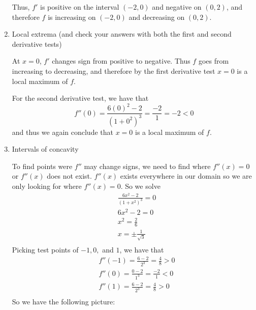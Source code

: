 \documentclass[nooutcomes]{ximera}
\begin{document}
\begin{problem}
\begin{enumerate}
\begin{freeResponse}
\begin{center}
\begin{image}
\end{image}
\end{center}


		Thus, $f'$ is positive on the interval $(-2,0)$ and negative on $(0,2)$, and therefore $f$ is increasing on $(-2,0)$ and decreasing on $(0,2)$.  
		\end{freeResponse}
		
	\item  Local extrema (and check your answers with both the first and second derivative tests)
	
		\begin{freeResponse}
		At $x=0$, $f'$ changes sign from positive to negative.  Thus $f$ goes from increasing to decreasing, and therefore by the first derivative test $x=0$ is a local maximum of $f$.  
		
		For the second derivative test, we have that
		$$ f''(0) = \frac{6(0)^2 - 2}{(1+0^2)^3} = \frac{-2}{1} = -2 < 0 $$
		and thus we again conclude that $x=0$ is a local maximum of $f$.
		\end{freeResponse}
		
	\item  Intervals of concavity
	
		\begin{freeResponse}
		To find points were $f''$ may change signs, we need to find where $f''(x)=0$ or $f''(x)$ does not exist.  $f''(x)$ exists everywhere in our domain so we are only looking for where $f''(x)=0$.  So we solve
		\begin{align*}
  		& \frac{6{{x}^{2}}-2}{{{(1+{{x}^{2}})}^{3}}}=0 \\ 
 		& 6{{x}^{2}}-2=0 \\ 
 		& {{x}^{2}}=\frac{2}{6} \\ 
 		& x=\pm \frac{1}{\sqrt{3}} \\ 
		\end{align*}
		Picking test points of $-1, 0, $ and $1$, we have that
		\begin{align*}
		& f''(-1) = \frac{6-2}{2^3} = \frac{4}{8} > 0 \\
		& f''(0) = \frac{0-2}{1^3} = \frac{-2}{1} < 0 \\
		& f''(1) = \frac{6-2}{2^3} = \frac{4}{8} > 0 \\
		\end{align*}
		So we have the following picture:
		

\end{freeResponse}
\end{enumerate}
\end{problem}
\end{document}
